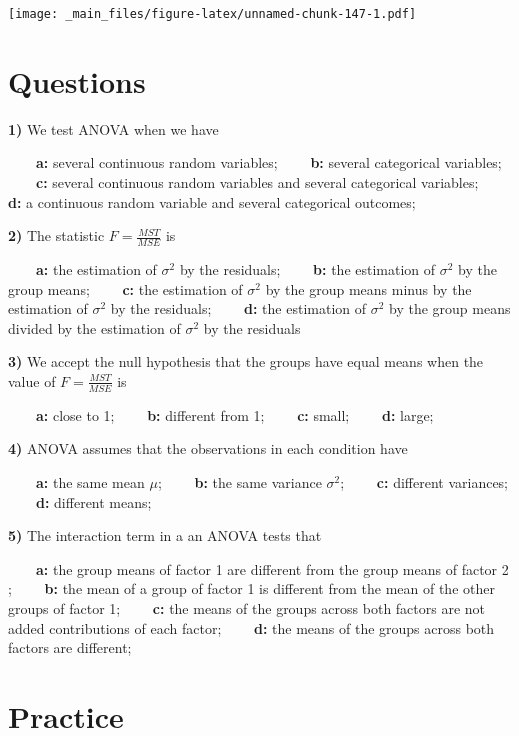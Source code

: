 \documentclass[
]{book}
\begin{document}
\texttt{[image: \_main\_files/figure-latex/unnamed-chunk-147-1.pdf]}

\hypertarget{questions-13}{%
\section{Questions}\label{questions-13}}

\textbf{1)} We test ANOVA when we have

\textbf{\(\qquad\)a:} several continuous random variables;
\textbf{\(\qquad\)b:} several categorical variables;
\textbf{\(\qquad\)c:} several continuous random variables and several categorical variables;
\textbf{\(\qquad\)d:} a continuous random variable and several categorical outcomes;

\textbf{2)} The statistic \(F=\frac{MST}{MSE}\) is

\textbf{\(\qquad\)a:} the estimation of \(\sigma^2\) by the residuals;
\textbf{\(\qquad\)b:} the estimation of \(\sigma^2\) by the group means;
\textbf{\(\qquad\)c:} the estimation of \(\sigma^2\) by the group means minus by the estimation of \(\sigma^2\) by the residuals;
\textbf{\(\qquad\)d:} the estimation of \(\sigma^2\) by the group means divided by the estimation of \(\sigma^2\) by the residuals

\textbf{3)} We accept the null hypothesis that the groups have equal means when the value of \(F=\frac{MST}{MSE}\) is

\textbf{\(\qquad\)a:} close to 1;
\textbf{\(\qquad\)b:} different from 1;
\textbf{\(\qquad\)c:} small;
\textbf{\(\qquad\)d:} large;

\textbf{4)} ANOVA assumes that the observations in each condition have

\textbf{\(\qquad\)a:} the same mean \(\mu\);
\textbf{\(\qquad\)b:} the same variance \(\sigma^2\);
\textbf{\(\qquad\)c:} different variances;
\textbf{\(\qquad\)d:} different means;

\textbf{5)} The interaction term in a an ANOVA tests that

\textbf{\(\qquad\)a:} the group means of factor 1 are different from the group means of factor 2 ;
\textbf{\(\qquad\)b:} the mean of a group of factor 1 is different from the mean of the other groups of factor 1;
\textbf{\(\qquad\)c:} the means of the groups across both factors are not added contributions of each factor;
\textbf{\(\qquad\)d:} the means of the groups across both factors are different;

\hypertarget{practice-7}{%
\section{Practice}\label{practice-7}}
\end{document}
